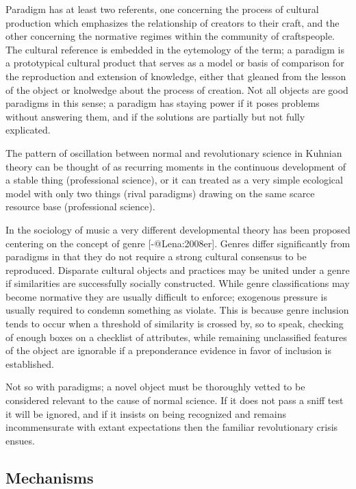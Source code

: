 \documentclass[]{article}
\begin{document}
Paradigm has at least two referents, one concerning the process of
cultural production which emphasizes the relationship of creators to
their craft, and the other concerning the normative regimes within the
community of craftspeople. The cultural reference is embedded in the
eytemology of the term; a paradigm is a prototypical cultural product
that serves as a model or basis of comparison for the reproduction and
extension of knowledge, either that gleaned from the lesson of the
object or knolwedge about the process of creation. Not all objects are
good paradigms in this sense; a paradigm has staying power if it poses
problems without answering them, and if the solutions are partially but
not fully explicated.

The pattern of oscillation between normal and revolutionary science in
Kuhnian theory can be thought of as recurring moments in the continuous
development of a stable thing (professional science), or it can treated
as a very simple ecological model with only two things (rival paradigms)
drawing on the same scarce resource base (professional science).

In the sociology of music a very different developmental theory has been
proposed centering on the concept of genre {[}-@Lena:2008er{]}. Genres
differ significantly from paradigms in that they do not require a strong
cultural consensus to be reproduced. Disparate cultural objects and
practices may be united under a genre if similarities are successfully
socially constructed. While genre classifications may become normative
they are usually difficult to enforce; exogenous pressure is usually
required to condemn something as violate. This is because genre
inclusion tends to occur when a threshold of similarity is crossed by,
so to speak, checking of enough boxes on a checklist of attributes,
while remaining unclassified features of the object are ignorable if a
preponderance evidence in favor of inclusion is established.

Not so with paradigms; a novel object must be thoroughly vetted to be
considered relevant to the cause of normal science. If it does not pass
a sniff test it will be ignored, and if it insists on being recognized
and remains incommensurate with extant expectations then the familiar
revolutionary crisis ensues.

\subsection{Mechanisms}\label{mechanisms}
\end{document}
